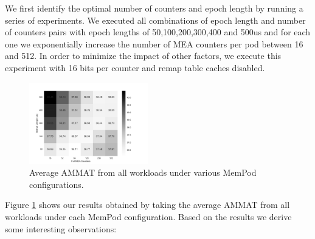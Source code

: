 We first identify the optimal number of counters and epoch length by running a series of experiments. We executed all combinations of epoch length and number of counters pairs with epoch lengths of 50,100,200,300,400 and 500us and for each one we exponentially increase the number of MEA counters per pod between 16 and 512. In order to minimize the impact of other factors, we execute this experiment with 16 bits per counter and remap table caches disabled. 

\begin{figure}[h]
	\centering
  \includegraphics[width=0.46\textwidth]{figures/revised/new/DSE.pdf}
  \caption{Average AMMAT from all workloads under various MemPod configurations.}
  \label{fig:dse}
\end{figure}

Figure \ref{fig:dse} shows our results obtained by taking the average AMMAT from all workloads under each MemPod configuration. Based on the results we derive some interesting observations:


